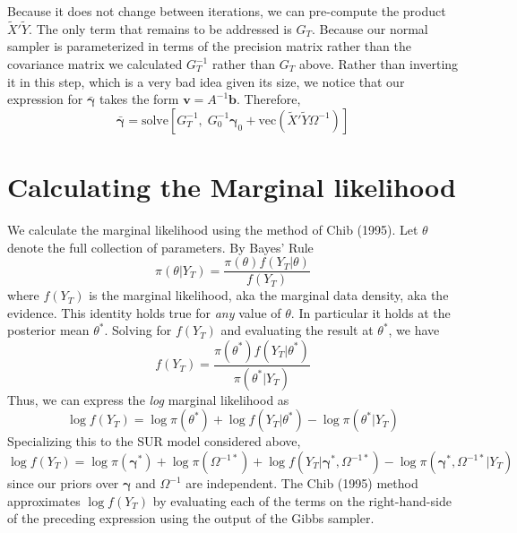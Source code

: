\documentclass[12pt]{article}
\begin{document}
Because it does not change between iterations, we can pre-compute the product $\widetilde{X}' \widetilde{Y}$.
The only term that remains to be addressed is $G_T$.
Because our normal sampler is parameterized in terms of the precision matrix rather than the covariance matrix we calculated $G_T^{-1}$ rather than $G_T$ above.
Rather than inverting it in this step, which is a very bad idea given its size, we notice that our expression for $\bar{\boldsymbol{\gamma}}$ takes the form $\mathbf{v}=A^{-1}\mathbf{b}$.
Therefore,
\begin{equation*}
\bar{\boldsymbol{\gamma}} = \mbox{solve}\left[ G_T^{-1}, \;  G_0^{-1}\boldsymbol{\gamma}_0 +\mbox{vec}\left( \widetilde{X}' \widetilde{Y} \Omega^{-1} \right)  \right]
\end{equation*}

\section{Calculating the Marginal likelihood}
We calculate the marginal likelihood using the method of Chib (1995).
Let $\theta$ denote the full collection of parameters.
By Bayes' Rule
\begin{equation*}
  \pi\left( \theta | Y_T \right) = \frac{\pi(\theta)f(Y_T|\theta)}{f(Y_T)}  
\end{equation*}
where $f(Y_T)$ is the marginal likelihood, aka the marginal data density, aka the evidence.
This identity holds true for \emph{any} value of $\theta$.
In particular it holds at the posterior mean $\theta^*$.
Solving for $f(Y_T)$ and evaluating the result at $\theta^*$, we have 
\begin{equation*}
  f\left(Y_T \right) = \frac{\pi(\theta^*)f(Y_T|\theta^*)}{\pi(\theta^*|Y_T)}  
\end{equation*}
Thus, we can express the \emph{log} marginal likelihood as
\begin{equation*}
  \log f(Y_T) = \log \pi(\theta^*) + \log f\left( Y_T|\theta^* \right) - \log \pi\left( \theta^*|Y_T \right)
\end{equation*}
Specializing this to the SUR model considered above,
\begin{equation*}
  \log f(Y_T) = \log \pi(\boldsymbol{\gamma}^*) + \log \pi\left( \Omega^{-1*} \right) + \log f\left( Y_T|\boldsymbol{\gamma}^*, \Omega^{-1*} \right) - \log \pi\left( \boldsymbol{\gamma}^*, \Omega^{-1*}|Y_T \right)
\end{equation*}
since our priors over $\boldsymbol{\gamma}$ and $\Omega^{-1}$ are independent.
The Chib (1995) method approximates $\log f(Y_T)$ by evaluating each of the terms on the right-hand-side of the preceding expression using the output of the Gibbs sampler.
\end{document}
